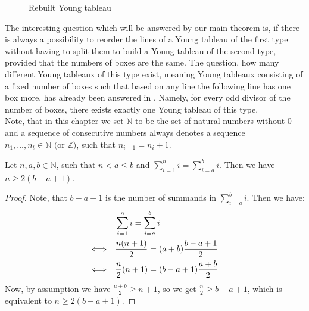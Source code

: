 \begin{figure}[ht]
\centering
{}
  \caption{Rebuilt Young tableau}
  \label{figure5:Figure 5}
\end{figure}

The interesting question which will be answered by our main theorem is, if there is always a possibility to reorder the lines of a Young tableau of the first type without having to split them to build a Young tableau of the second type, provided that the numbers of boxes are the same. The question, how many different Young tableaux of this type exist, meaning Young tableaux consisting of a fixed number of boxes such that based on any line the following line has one box more, has already been answered in \cite{5}. Namely, for every odd divisor of the number of boxes, there exists exactly one Young tableau of this type.\\
Note, that in this chapter we set \(\mathbb{N}\) to be the set of natural numbers without \(0\) and a sequence of consecutive numbers always denotes a sequence\\
\(n_1,\ldots,n_t\in\mathbb{N}\text{ (or }\mathbb{Z})\), such that \(n_{i+1}=n_i+1\).
\begin{lem}\label{lemma14}
Let \(n,a,b\in\mathbb{N}\), such that \(n<a\leq b\) and \(\sum\limits_{i=1}^ni=\sum\limits_{i=a}^bi\). Then we have\\
\(n\geq 2(b-a+1)\).
\begin{proof}
Note, that \(b-a+1\) is the number of summands in \(\sum\limits_{i=a}^bi\). Then we have:
\begin{align}
&\sum\limits_{i=1}^ni=\sum\limits_{i=a}^bi\notag\\
\Longleftrightarrow\quad &\frac{n(n+1)}{2}=(a+b)\frac{b-a+1}{2}\notag\\
\Longleftrightarrow\quad &\frac{n}{2}(n+1)=(b-a+1)\frac{a+b}{2}\notag
\end{align}
Now, by assumption we have \(\frac{a+b}{2}\geq n+1\), so we get \(\frac{n}{2}\geq b-a+1\), which is equivalent to \(n\geq 2(b-a+1)\).
\end{proof}
\end{lem}

